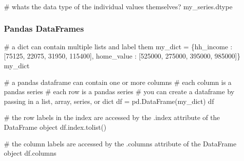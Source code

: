 \documentclass[
  letterpaper,
  DIV=11,
  numbers=noendperiod]{scrreprt}
\newenvironment{Shaded}{\begin{snugshade}}{\end{snugshade}}
\newcommand{\CommentTok}[1]{\textcolor[rgb]{0.37,0.37,0.37}{#1}}
\newcommand{\DecValTok}[1]{\textcolor[rgb]{0.68,0.00,0.00}{#1}}
\newcommand{\NormalTok}[1]{\textcolor[rgb]{0.00,0.23,0.31}{#1}}
\newcommand{\OperatorTok}[1]{\textcolor[rgb]{0.37,0.37,0.37}{#1}}
\newcommand{\StringTok}[1]{\textcolor[rgb]{0.13,0.47,0.30}{#1}}
\begin{document}
\begin{Shaded}
\begin{Highlighting}[]
\CommentTok{\# what\textquotesingle{}s the data type of the individual values themselves?}
\NormalTok{my\_series.dtype}
\end{Highlighting}
\end{Shaded}

\hypertarget{pandas-dataframes}{%
\subsubsection{Pandas DataFrames}\label{pandas-dataframes}}

\begin{Shaded}
\begin{Highlighting}[]
\CommentTok{\# a dict can contain multiple lists and label them}
\NormalTok{my\_dict }\OperatorTok{=}\NormalTok{ \{}\StringTok{\textquotesingle{}hh\_income\textquotesingle{}}\NormalTok{  : [}\DecValTok{75125}\NormalTok{, }\DecValTok{22075}\NormalTok{, }\DecValTok{31950}\NormalTok{, }\DecValTok{115400}\NormalTok{],}
           \StringTok{\textquotesingle{}home\_value\textquotesingle{}}\NormalTok{ : [}\DecValTok{525000}\NormalTok{, }\DecValTok{275000}\NormalTok{, }\DecValTok{395000}\NormalTok{, }\DecValTok{985000}\NormalTok{]\}}
\NormalTok{my\_dict}
\end{Highlighting}
\end{Shaded}

\begin{Shaded}
\begin{Highlighting}[]
\CommentTok{\# a pandas dataframe can contain one or more columns}
\CommentTok{\# each column is a pandas series}
\CommentTok{\# each row is a pandas series}
\CommentTok{\# you can create a dataframe by passing in a list, array, series, or dict}
\NormalTok{df }\OperatorTok{=}\NormalTok{ pd.DataFrame(my\_dict)}
\NormalTok{df}
\end{Highlighting}
\end{Shaded}

\begin{Shaded}
\begin{Highlighting}[]
\CommentTok{\# the row labels in the index are accessed by the .index attribute of the DataFrame object}
\NormalTok{df.index.tolist()}
\end{Highlighting}
\end{Shaded}

\begin{Shaded}
\begin{Highlighting}[]
\CommentTok{\# the column labels are accessed by the .columns attribute of the DataFrame object}
\NormalTok{df.columns}
\end{Highlighting}
\end{Shaded}
\end{document}
